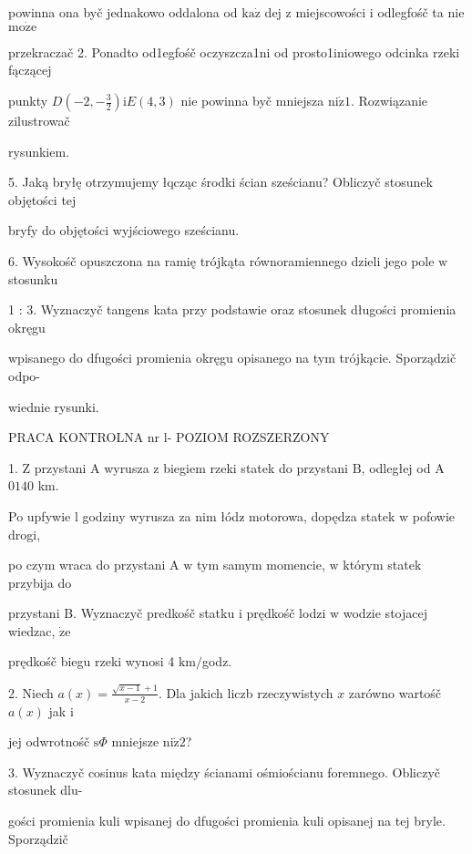 \documentclass[a4paper,12pt]{article}
\begin{document}
powinna ona byč jednakowo oddalona od $\mathrm{k}\mathrm{a}\dot{\mathrm{z}}$ dej $\mathrm{z}$ miejscowości $\mathrm{i}$ odlegfośč ta nie $\mathrm{m}\mathrm{o}\dot{\mathrm{z}}\mathrm{e}$

przekraczač 2. Ponadto od1egfośč oczyszcza1ni od prosto1iniowego odcinka rzeki fączącej

punkty $D(-2,-\displaystyle \frac{3}{2}) \mathrm{i}E(4,3)$ nie powinna byč mniejsza $\mathrm{n}\mathrm{i}\dot{\mathrm{z}} 1$. Rozwiązanie zilustrowač

rysunkiem.

5. Jaką bryłę otrzymujemy łqcząc środki ścian sześcianu? Obliczyč stosunek objętości tej

bryfy do objętości wyjściowego sześcianu.

6. Wysokośč opuszczona na ramię trójkąta równoramiennego dzieli jego pole $\mathrm{w}$ stosunku

1 : 3. Wyznaczyč tangens kata przy podstawie oraz stosunek długości promienia okręgu

wpisanego do dfugości promienia okręgu opisanego na tym trójkącie. Sporządzič odpo-

wiednie rysunki.




PRACA KONTROLNA nr l- POZIOM ROZSZERZONY

1. $\mathrm{Z}$ przystani A wyrusza $\mathrm{z}$ biegiem rzeki statek do przystani $\mathrm{B}$, odległej od A $0140$ km.

Po upfywie l godziny wyrusza za nim łódz$\acute{}$ motorowa, dopędza statek $\mathrm{w}$ pofowie drogi,

po czym wraca do przystani A $\mathrm{w}$ tym samym momencie, $\mathrm{w}$ którym statek przybija do

przystani B. Wyznaczyč predkośč statku $\mathrm{i}$ prędkośč lodzi $\mathrm{w}$ wodzie stojacej wiedzac, $\dot{\mathrm{z}}\mathrm{e}$

prędkośč biegu rzeki wynosi 4 $\mathrm{k}\mathrm{m}/$godz.

2. Niech $a(x)=\displaystyle \frac{\sqrt{x-1}+1}{x-2}$. Dla jakich liczb rzeczywistych $x$ zarówno wartośč $a(x)$ jak $\mathrm{i}$

jej odwrotnośč $\mathrm{s}\Phi$ mniejsze $\mathrm{n}\mathrm{i}\dot{\mathrm{z}}2$?

3. Wyznaczyč cosinus kata między ścianami ośmiościanu foremnego. Obliczyč stosunek dlu-

gości promienia kuli wpisanej do dfugości promienia kuli opisanej na tej bryle. Sporządzič
\end{document}
